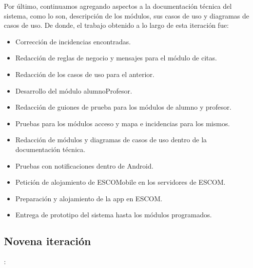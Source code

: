 \newline
\newline
Por último, continuamos agregando aspectos a la documentación técnica del sistema, como lo son, descripción de los módulos, sus casos de uso y diagramas de casos de uso.
\newline
De donde, el trabajo obtenido a lo largo de esta iteración fue:
\begin{itemize}
	\item Corrección de incidencias encontradas.
	\item Redacción de reglas de negocio y mensajes para el módulo de citas.
	\item Redacción de los casos de uso para el anterior.
	\item Desarrollo del módulo alumnoProfesor.
	\item Redacción de guiones de prueba para los módulos de alumno y profesor.
	\item Pruebas para los módulos acceso y mapa e incidencias para los mismos.
	\item Redacción de módulos y diagramas de casos de uso dentro de la documentación técnica.
	\item Pruebas con notificaciones dentro de Android.
	\item Petición de alojamiento de ESCOMobile en los servidores de ESCOM.
	\item Preparación y alojamiento de la app en ESCOM.
	\item Entrega de prototipo del sistema hasta los módulos programados.
\end{itemize}


\subsection{Novena iteración}: 

